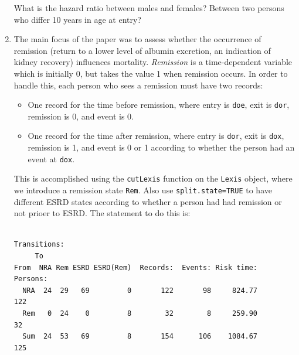 \documentclass[
]{book}
\newenvironment{Shaded}{\begin{snugshade}}{\end{snugshade}}
\newcommand{\AttributeTok}[1]{\textcolor[rgb]{0.13,0.29,0.53}{#1}}
\newcommand{\CommentTok}[1]{\textcolor[rgb]{0.56,0.35,0.01}{\textit{#1}}}
\newcommand{\ConstantTok}[1]{\textcolor[rgb]{0.56,0.35,0.01}{#1}}
\newcommand{\FunctionTok}[1]{\textcolor[rgb]{0.13,0.29,0.53}{\textbf{#1}}}
\newcommand{\NormalTok}[1]{#1}
\newcommand{\OtherTok}[1]{\textcolor[rgb]{0.56,0.35,0.01}{#1}}
\newcommand{\SpecialCharTok}[1]{\textcolor[rgb]{0.81,0.36,0.00}{\textbf{#1}}}
\newcommand{\StringTok}[1]{\textcolor[rgb]{0.31,0.60,0.02}{#1}}
\providecommand{\tightlist}{%
  \setlength{\itemsep}{0pt}\setlength{\parskip}{0pt}}
\begin{document}
\begin{enumerate}
  What is the hazard ratio between males and females?
  Between two persons who differ 10 years in age at entry?
\item
  The main focus of the paper was to assess whether the occurrence of
  remission (return to a lower level of albumin excretion, an
  indication of kidney recovery) influences mortality.
  \emph{Remission} is a time-dependent variable which is initially 0, but
  takes the value 1 when remission occurs. In order to handle this, each
  person who sees a remission must have two records:

  \begin{itemize}
  \tightlist
  \item
    One record for the time before remission, where entry is
    \texttt{doe}, exit is \texttt{dor}, remission is 0, and event is 0.
  \item
    One record for the time after remission, where entry is
    \texttt{dor}, exit is \texttt{dox}, remission is 1, and event is 0
    or 1 according to whether the person had an event at \texttt{dox}.
  \end{itemize}

  This is accomplished using the \texttt{cutLexis} function on the
  \texttt{Lexis} object, where we introduce a remission state \texttt{Rem}.
  Also use \texttt{split.state=TRUE} to
  have different ESRD states according to whether a person had had
  remission or not prioer to ESRD. The statement to do this is:

\begin{Shaded}
\end{Shaded}

\begin{verbatim}

Transitions:
     To
From  NRA Rem ESRD ESRD(Rem)  Records:  Events: Risk time:  Persons:
  NRA  24  29   69         0       122       98     824.77       122
  Rem   0  24    0         8        32        8     259.90        32
  Sum  24  53   69         8       154      106    1084.67       125
\end{verbatim}


\end{enumerate}
\end{document}
